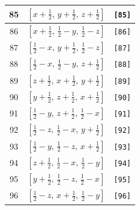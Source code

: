 \documentclass[fleqn,8pt]{jsarticle}
\begin{document}
\begin{longtable}{ccc}
85 & $\left[ x + \frac{1}{2},\, y + \frac{1}{2},\, z + \frac{1}{2} \right]$ & {\tt [85]} \\ \hline
86 & $\left[ x + \frac{1}{2},\, \frac{1}{2} - y,\, \frac{1}{2} - z \right]$ & {\tt [86]} \\ \hline
87 & $\left[ \frac{1}{2} - x,\, y + \frac{1}{2},\, \frac{1}{2} - z \right]$ & {\tt [87]} \\ \hline
88 & $\left[ \frac{1}{2} - x,\, \frac{1}{2} - y,\, z + \frac{1}{2} \right]$ & {\tt [88]} \\ \hline
89 & $\left[ z + \frac{1}{2},\, x + \frac{1}{2},\, y + \frac{1}{2} \right]$ & {\tt [89]} \\ \hline
90 & $\left[ y + \frac{1}{2},\, z + \frac{1}{2},\, x + \frac{1}{2} \right]$ & {\tt [90]} \\ \hline
91 & $\left[ \frac{1}{2} - y,\, z + \frac{1}{2},\, \frac{1}{2} - x \right]$ & {\tt [91]} \\ \hline
92 & $\left[ \frac{1}{2} - z,\, \frac{1}{2} - x,\, y + \frac{1}{2} \right]$ & {\tt [92]} \\ \hline
93 & $\left[ \frac{1}{2} - y,\, \frac{1}{2} - z,\, x + \frac{1}{2} \right]$ & {\tt [93]} \\ \hline
94 & $\left[ z + \frac{1}{2},\, \frac{1}{2} - x,\, \frac{1}{2} - y \right]$ & {\tt [94]} \\ \hline
95 & $\left[ y + \frac{1}{2},\, \frac{1}{2} - z,\, \frac{1}{2} - x \right]$ & {\tt [95]} \\ \hline
96 & $\left[ \frac{1}{2} - z,\, x + \frac{1}{2},\, \frac{1}{2} - y \right]$ & {\tt [96]} \\
\end{longtable}
\end{document}
